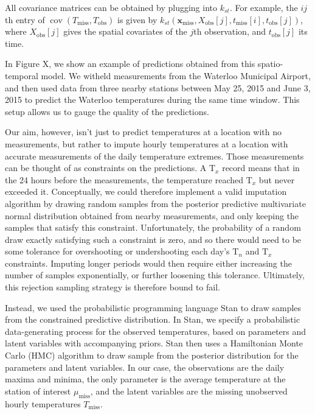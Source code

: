 \documentclass[letter]{article}
\newcommand{\genericdel}[3]{%
      \left#1#3\right#2
    }
\newcommand{\del}[1]{\genericdel(){#1}}
\newcommand{\sbr}[1]{\genericdel[]{#1}}
\DeclareMathOperator{\cov}{{cov}}
\newcommand{\Tn}{\mathrm{T}_{n}}
\newcommand{\Tx}{\mathrm{T}_{x}}
\newcommand{\xvec}{\mathbf{x}}
\newcommand{\miss}{\mathrm{miss}}
\newcommand{\obs}{\mathrm{obs}}
\begin{document}
All covariance matrices can be obtained by plugging into \(k_{st}\). For
example, the \(ij\)th entry of \(\cov\del{T_\miss, T_\obs}\) is given by
\(k_{st}(\xvec_\miss,X_\obs\sbr{j},t_\miss\sbr{i},t_\obs\sbr{j})\),
where \(X_\obs\sbr{j}\) gives the spatial covariates of the \(j\)th
observation, and \(t_\obs\sbr{j}\) its time.

In Figure X, we show an example of predictions obtained from this
spatio-temporal model. We witheld measurements from the Waterloo
Municipal Airport, and then used data from three nearby stations between
May 25, 2015 and June 3, 2015 to predict the Waterloo temperatures
during the same time window. This setup allows us to gauge the quality
of the predictions.
    


    	Our aim, however, isn't just to predict temperatures at a location with
no measurements, but rather to impute hourly temperatures at a location
with accurate measurements of the daily temperature extremes. Those
measurements can be thought of as constraints on the predictions. A
\(\Tx\) record means that in the 24 hours before the measurements, the
temperature reached \(\Tx\) but never exceeded it. Conceptually, we
could therefore implement a valid imputation algorithm by drawing random
samples from the posterior predictive multivariate normal distribution
obtained from nearby measurements, and only keeping the samples that
satisfy this constraint. Unfortunately, the probability of a random draw
exactly satisfying such a constraint is zero, and so there would need to
be some tolerance for overshooting or undershooting each day's \(\Tn\)
and \(\Tx\) constraints. Imputing longer periods would then require
either increasing the number of samples exponentially, or further
loosening this tolerance. Ultimately, this rejection sampling strategy
is therefore bound to fail.

Instead, we used the probabilistic programming language Stan to draw
samples from the constrained predictive distribution. In Stan, we
specify a probabilistic data-generating process for the observed
temperatures, based on parameters and latent variables with accompanying
priors. Stan then uses a Hamiltonian Monte Carlo (HMC) algorithm to draw
sample from the posterior distribution for the parameters and latent
variables. In our case, the observations are the daily maxima and
minima, the only parameter is the average temperature at the station of
interest \(\mu_\miss\), and the latent variables are the missing
unobserved hourly temperatures \(T_\miss\).
\end{document}
